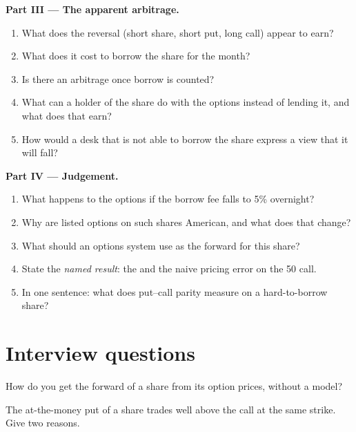 \begin{problem}
\medskip\noindent\textbf{Part III --- The apparent arbitrage.}
\begin{enumerate}[resume]
\item What does the reversal (short share, short put, long call) appear to earn?
\item What does it cost to borrow the share for the month?
\item Is there an arbitrage once borrow is counted?
\item What can a holder of the share do with the options instead of lending it, and what
does that earn?
\item How would a desk that is not able to borrow the share express a view that it will fall?
\end{enumerate}

\medskip\noindent\textbf{Part IV --- Judgement.}
\begin{enumerate}[resume]
\item What happens to the options if the borrow fee falls to 5\% overnight?
\item Why are listed options on such shares American, and what does that change?
\item What should an options system use as the forward for this share?
\item State the \emph{named result}: the  and the naive pricing error on
the 50 call.
\item In one sentence: what does put--call parity measure on a hard-to-borrow share?
\end{enumerate}
\end{problem}

\section{Interview questions}

\begin{interviewq}\label{iq:dv:dividends-borrow-and-forwards:1}
How do you get the forward of a share from its option prices, without a model?
\end{interviewq}

\begin{interviewq}\label{iq:dv:dividends-borrow-and-forwards:2}
The at-the-money put of a share trades well above the call at the same strike. Give two
reasons.
\end{interviewq}

